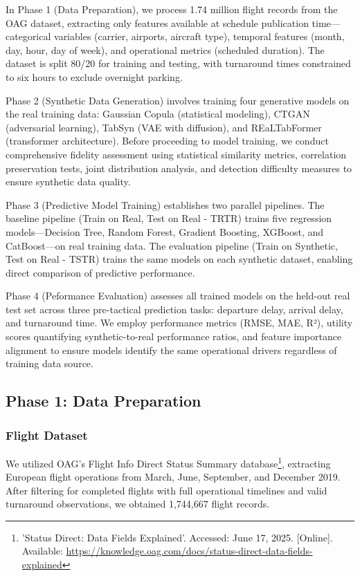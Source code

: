 \documentclass[conference]{IEEEtran}
\begin{document}
In Phase 1 (Data Preparation), we process 1.74 million flight records from the OAG dataset, extracting only features available at schedule publication time—categorical variables (carrier, airports, aircraft type), temporal features (month, day, hour, day of week), and operational metrics (scheduled duration). The dataset is split 80/20 for training and testing, with turnaround times constrained to six hours to exclude overnight parking.

Phase 2 (Synthetic Data Generation) involves training four generative models on the real training data: Gaussian Copula (statistical modeling), CTGAN (adversarial learning), TabSyn (VAE with diffusion), and REaLTabFormer (transformer architecture). Before proceeding to model training, we conduct comprehensive fidelity assessment using statistical similarity metrics, correlation preservation tests, joint distribution analysis, and detection difficulty measures to ensure synthetic data quality.

Phase 3 (Predictive Model Training) establishes two parallel pipelines. The baseline pipeline (Train on Real, Test on Real - TRTR) trains five regression models—Decision Tree, Random Forest, Gradient Boosting, XGBoost, and CatBoost—on real training data. The evaluation pipeline (Train on Synthetic, Test on Real - TSTR) trains the same models on each synthetic dataset, enabling direct comparison of predictive performance.

Phase 4 (Peformance Evaluation) assesses all trained models on the held-out real test set across three pre-tactical prediction tasks: departure delay, arrival delay, and turnaround time. We employ performance metrics (RMSE, MAE, R²), utility scores quantifying synthetic-to-real performance ratios, and feature importance alignment to ensure models identify the same operational drivers regardless of training data source.

\subsection{Phase 1: Data Preparation}

\subsubsection{Flight Dataset}

We utilized OAG's Flight Info Direct Status Summary database\footnote{'Status Direct: Data Fields Explained'. Accessed: June 17, 2025. [Online]. Available: \url{https://knowledge.oag.com/docs/status-direct-data-fields-explained}}, extracting European flight operations from March, June, September, and December 2019. After filtering for completed flights with full operational timelines and valid turnaround observations, we obtained 1,744,667 flight records.
\end{document}
